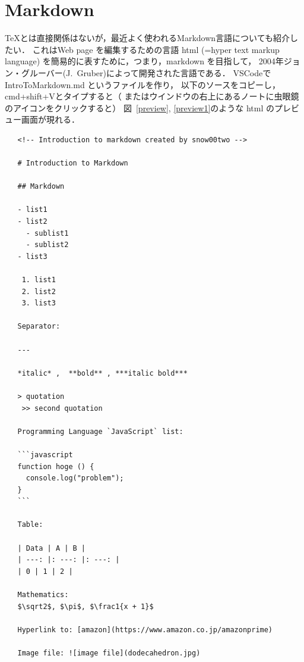 %
%   
%   
%   
%   

\section{Markdown}
\TeX とは直接関係はないが，最近よく使われるMarkdown言語についても紹介したい．
これはWeb page を編集するための言語 html (=hyper text markup language) 
を簡易的に表すために，つまり，markdown を目指して，
2004年ジョン・グルーバー(J.~Gruber)によって開発された言語である．
VSCodeで IntroToMarkdown.md というファイルを作り，
以下のソースをコピーし，cmd+shift+Vとタイプすると（
またはウインドウの右上にあるノートに虫眼鏡のアイコンをクリックすると）
図~\ref{preview}, \ref{preview1}のような html のプレビュー画面が現れる．

\begin{verbatim}
   <!-- Introduction to markdown created by snow00two -->
   
   # Introduction to Markdown
   
   ## Markdown
   
   - list1
   - list2
     - sublist1
     - sublist2
   - list3
   
    1. list1
    2. list2
    3. list3
   
   Separator:
   
   ---
   
   *italic* ,  **bold** , ***italic bold***
   
   > quotation
    >> second quotation
   
   Programming Language `JavaScript` list:
   
   ```javascript
   function hoge () {
     console.log("problem");
   }
   ```
   
   Table:
   
   | Data | A | B |
   | ---: |: ---: |: ---: |
   | 0 | 1 | 2 |
   
   Mathematics:
   $\sqrt2$, $\pi$, $\frac1{x + 1}$
   
   Hyperlink to: [amazon](https://www.amazon.co.jp/amazonprime)
   
   Image file: ![image file](dodecahedron.jpg)
     
\end{verbatim}

